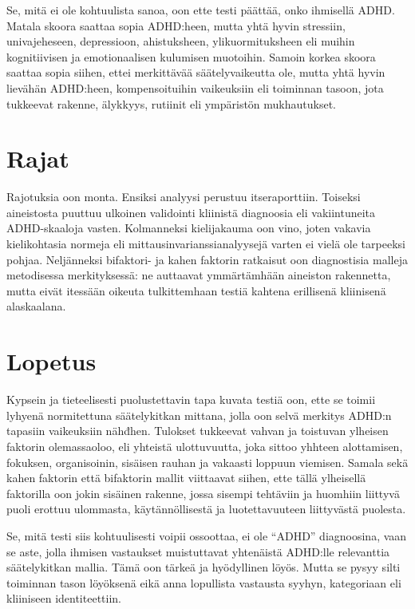 \documentclass[11pt,a4paper]{article}
\begin{document}
Se, mitä ei ole kohtuulista sanoa, oon ette testi päättää, onko ihmisellä ADHD. Matala skoora saattaa sopia ADHD:heen, mutta yhtä hyvin stressiin, univajeheseen, depressioon, ahistuksheen, ylikuormituksheen eli muihin kognitiivisen ja emotionaalisen kulumisen muotoihin. Samoin korkea skoora saattaa sopia siihen, ettei merkittävää säätelyvaikeutta ole, mutta yhtä hyvin lievähän ADHD:heen, kompensoituihin vaikeuksiin eli toiminnan tasoon, jota tukkeevat rakenne, älykkyys, rutiinit eli ympäristön mukhautukset.

\section{Rajat}
Rajotuksia oon monta. Ensiksi analyysi perustuu itseraporttiin. Toiseksi aineistosta puuttuu ulkoinen validointi kliinistä diagnoosia eli vakiintuneita ADHD-skaaloja vasten. Kolmanneksi kielijakauma oon vino, joten vakavia kielikohtasia normeja eli mittausinvarianssianalyysejä varten ei vielä ole tarpeeksi pohjaa. Neljänneksi bifaktori- ja kahen faktorin ratkaisut oon diagnostisia malleja metodisessa merkityksessä: ne auttaavat ymmärtämhään aineiston rakennetta, mutta eivät itessään oikeuta tulkittemhaan testiä kahtena erillisenä kliinisenä alaskaalana.

\section{Lopetus}
Kypsein ja tieteelisesti puolustettavin tapa kuvata testiä oon, ette se toimii lyhyenä normitettuna säätelykitkan mittana, jolla oon selvä merkitys ADHD:n tapasiin vaikeuksiin nähđhen. Tulokset tukkeevat vahvan ja toistuvan ylheisen faktorin olemassaoloo, eli yhteistä ulottuvuutta, joka sittoo yhhteen alottamisen, fokuksen, organisoinin, sisäisen rauhan ja vakaasti loppuun viemisen. Samala sekä kahen faktorin että bifaktorin mallit viittaavat siihen, ette tällä ylheisellä faktorilla oon jokin sisäinen rakenne, jossa sisempi tehtäviin ja huomhiin liittyvä puoli erottuu ulommasta, käytännöllisestä ja luotettavuuteen liittyvästä puolesta.

Se, mitä testi siis kohtuulisesti voipii ossoottaa, ei ole ``ADHD'' diagnoosina, vaan se aste, jolla ihmisen vastaukset muistuttavat yhtenäistä ADHD:lle relevanttia säätelykitkan mallia. Tämä oon tärkeä ja hyödyllinen löyös. Mutta se pysyy silti toiminnan tason löyöksenä eikä anna lopullista vastausta syyhyn, kategoriaan eli kliiniseen identiteettiin.

\printbibliography
\end{document}
